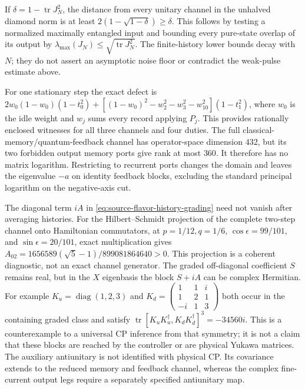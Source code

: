If \(\delta=1-\operatorname{tr}J_N^2\), the distance from every unitary
channel in the unhalved diamond norm is at least
\(2(1-\sqrt{1-\delta})\ge\delta\). This follows by testing a normalized
maximally entangled input and bounding every pure-state overlap of its
output by \(\lambda_{\max}(J_N)\le\sqrt{\operatorname{tr}J_N^2}\).
The finite-history lower bounds decay with \(N\); they do not assert an
asymptotic noise floor or contradict the weak-pulse estimate above.

For one stationary step the exact defect is
\(2w_0(1-w_0)(1-t_0^2)+[(1-w_0)^2-w_2^2-w_3^2-w_{10}^2](1-t_1^2)\),
where \(w_0\) is the idle weight and \(w_j\) sums every record applying
\(P_j\). This provides rationally enclosed witnesses for all three
channels and four duties. The full classical-memory/quantum-feedback channel has
operator-space dimension \(432\), but its two forbidden output memory
ports give rank at most \(360\). It therefore has no matrix logarithm.
Restricting to recurrent ports changes the domain and leaves the
eigenvalue \(-a\) on identity feedback blocks, excluding the standard
principal logarithm on the negative-axis cut.

The diagonal term \(iA\) in
\eqref{eq:source-flavor-history-grading} need not vanish after averaging
histories. For the Hilbert--Schmidt projection of the complete two-step
channel onto Hamiltonian commutators, at \(p=1/12,q=1/6\),
\(\cos\epsilon=99/101\), and \(\sin\epsilon=20/101\), exact multiplication
gives \(A_{02}=1656589(\sqrt5-1)/899081864640>0\). This projection is a
coherent diagnostic, not an exact channel generator.
The graded off-diagonal coefficient \(S\) remains real, but in the
\(X\) eigenbasis the block \(S+iA\) can be complex Hermitian. For example
\(K_u=\operatorname{diag}(1,2,3)\) and
\(K_d=\left(\begin{smallmatrix}1&1&i\\1&2&1\\-i&1&3\end{smallmatrix}\right)\)
both occur in the containing graded class and satisfy
\(\operatorname{tr}[K_uK_u^\dagger,K_dK_d^\dagger]^3=-34560i\).
This is a counterexample to a universal CP inference from that symmetry;
it is not a claim that these blocks are reached by the controller or are
physical Yukawa matrices. The auxiliary antiunitary is not identified
with physical CP. Its covariance extends to the reduced memory and
feedback channel, whereas the complex fine-current output legs require
a separately specified antiunitary map.
